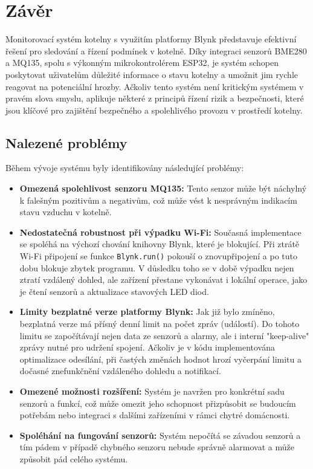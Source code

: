 \documentclass[12pt, twoside]{article} %
\begin{document}
\section{Závěr}
Monitorovací systém kotelny s využitím platformy Blynk představuje efektivní řešení pro sledování a řízení podmínek v kotelně. Díky integraci senzorů BME280 a MQ135, spolu s výkonným mikrokontrolérem ESP32, je systém schopen poskytovat uživatelům důležité informace o stavu kotelny a umožnit jim rychle reagovat na potenciální hrozby. Ačkoliv tento systém není kritickým systémem v pravém slova smyslu, aplikuje některé z principů řízení rizik a bezpečnosti, které jsou klíčové pro zajištění bezpečného a spolehlivého provozu v prostředí kotelny.

\subsection{Nalezené problémy}
Během vývoje systému byly identifikovány následující problémy:
\begin{itemize}
    \item \textbf{Omezená spolehlivost senzoru MQ135:} Tento senzor může být náchylný k falešným pozitivům a negativům, což může vést k nesprávným indikacím stavu vzduchu v kotelně.
    
    \item \textbf{Nedostatečná robustnost při výpadku Wi-Fi:} Současná implementace se spoléhá na výchozí chování knihovny Blynk, které je blokující. Při ztrátě Wi-Fi připojení se funkce \texttt{Blynk.run()} pokouší o znovupřipojení a po tuto dobu blokuje zbytek programu. V důsledku toho se v době výpadku nejen ztratí vzdálený dohled, ale zařízení přestane vykonávat i lokální operace, jako je čtení senzorů a aktualizace stavových LED diod.
    
    \item \textbf{Limity bezplatné verze platformy Blynk:} Jak již bylo zmíněno, bezplatná verze má přísný denní limit na počet zpráv (událostí). Do tohoto limitu se započítávají nejen data ze senzorů a alarmy, ale i interní "keep-alive" zprávy nutné pro udržení spojení. Ačkoliv je v kódu implementována optimalizace odesílání, při častých změnách hodnot hrozí vyčerpání limitu a dočasné znefunkčnění vzdáleného dohledu a notifikací.

    \item \textbf{Omezené možnosti rozšíření:} Systém je navržen pro konkrétní sadu senzorů a funkcí, což může omezit jeho schopnost přizpůsobit se budoucím potřebám nebo integraci s dalšími zařízeními v rámci chytré domácnosti.
    \item \textbf{Spoléhání na fungování senzorů:} Systém nepočítá se závadou senzorů a tím pádem v případě chybného senzoru nebude správně alarmovat a může způsobit pád celého systému.
\end{itemize}
\end{document}
